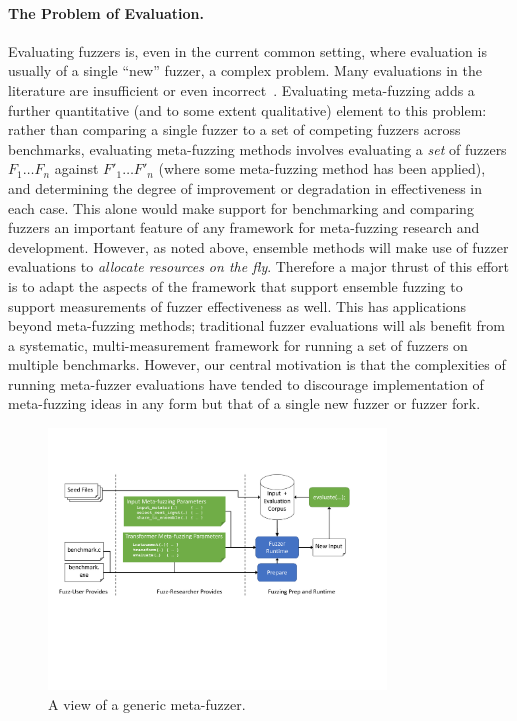 \paragraph{The Problem of Evaluation.} Evaluating fuzzers is, even in the 
current common setting, where evaluation is usually of a single ``new'' fuzzer, 
a complex problem. Many evaluations in the literature are insufficient or even 
incorrect~\cite{FuzzerHicks}.  Evaluating meta-fuzzing adds a further quantitative (and to some 
extent qualitative) element to this problem: rather than comparing a single 
fuzzer to a set of competing fuzzers across benchmarks, evaluating meta-fuzzing 
methods involves evaluating a \emph{set} of fuzzers $F_1 \ldots F_n$ against 
$F'_1 \ldots F'_n$ (where some meta-fuzzing method has been applied), and 
determining the degree of improvement or degradation in effectiveness in each 
case.  This alone would make support for benchmarking and comparing fuzzers an 
important feature of any framework for meta-fuzzing research and development.  
However, as noted above, ensemble methods will  make use of 
fuzzer evaluations to \emph{allocate resources on the fly}.  Therefore a major thrust of this 
effort is to adapt the aspects of the framework that support ensemble fuzzing 
to support measurements of fuzzer effectiveness as well.  This has applications beyond meta-fuzzing methods; traditional fuzzer 
evaluations will als  benefit from a systematic, 
multi-measurement framework for running a set of fuzzers on multiple
benchmarks.  However, our central motivation is that the complexities of running
meta-fuzzer evaluations have tended to discourage implementation of
meta-fuzzing ideas in any form but that of a single new fuzzer
or fuzzer fork.


\begin{figure}
\centering
\includegraphics[width=0.8\textwidth,trim={0.3in 3.0in 1.2in 1.4in},clip]{figures/fuzzer-arch.pdf}
\caption{A view of a generic meta-fuzzer.}
\label{fig:meta}
\end{figure}


